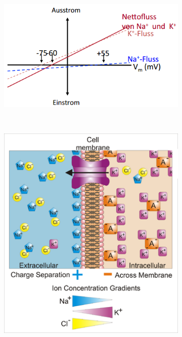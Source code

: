 \documentclass[a4paper, 12pt]{article}
\begin{document}
\begin{figure}[H]
	\centering
	\begin{subfigure}[b]{0.5\textwidth}
		\centering
		\includegraphics[width=\textwidth]{equilibrium_nernst_01.png}
	\end{subfigure}%
	~
	\begin{subfigure}[b]{0.3\textwidth}
		\centering
		\includegraphics[width=\textwidth]{membrane_potential.png}
	\end{subfigure}
\end{figure}
\end{document}
